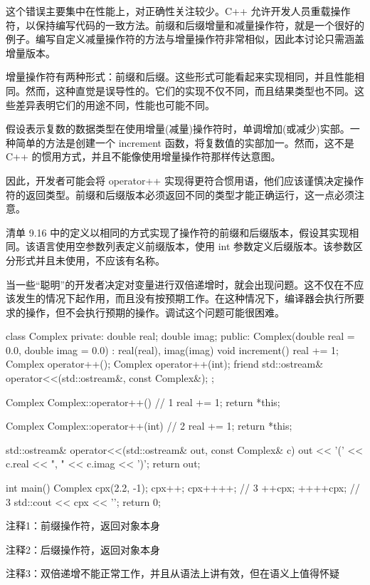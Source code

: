 这个错误主要集中在性能上，对正确性关注较少。C++ 允许开发人员重载操作符，以保持编写代码的一致方法。前缀和后缀增量和减量操作符，就是一个很好的例子。编写自定义减量操作符的方法与增量操作符非常相似，因此本讨论只需涵盖增量版本。

增量操作符有两种形式：前缀和后缀。这些形式可能看起来实现相同，并且性能相同。然而，这种直觉是误导性的。它们的实现不仅不同，而且结果类型也不同。这些差异表明它们的用途不同，性能也可能不同。


假设表示复数的数据类型在使用增量(减量)操作符时，单调增加(或减少)实部。一种简单的方法是创建一个 increment 函数，将复数值的实部加一。然而，这不是 C++ 的惯用方式，并且不能像使用增量操作符那样传达意图。

因此，开发者可能会将 operator++ 实现得更符合惯用语，他们应该谨慎决定操作符的返回类型。前缀和后缀版本必须返回不同的类型才能正确运行，这一点必须注意。

清单 9.16 中的定义以相同的方式实现了操作符的前缀和后缀版本，假设其实现相同。该语言使用空参数列表定义前缀版本，使用 int 参数定义后缀版本。该参数区分形式并且未使用，不应该有名称。

当一些“聪明”的开发者决定对变量进行双倍递增时，就会出现问题。这不仅在不应该发生的情况下起作用，而且没有按预期工作。在这种情况下，编译器会执行所要求的操作，但不会执行预期的操作。调试这个问题可能很困难。


\begin{cpp}
class Complex {
private:
  double real;
  double imag;
public:
  Complex(double real = 0.0, double imag = 0.0) : real(real), imag(imag) {}
  void increment() { real += 1; }
  Complex operator++();
  Complex operator++(int);
friend std::ostream& operator<<(std::ostream&, const Complex&);
};

Complex Complex::operator++() { // 1
  real += 1;
  return *this;
}

Complex Complex::operator++(int) { // 2
  real += 1;
  return *this;
}

std::ostream& operator<<(std::ostream& out, const Complex& c) {
  out << '(' << c.real << ", " << c.imag << ')';
  return out;
}

int main() {
  Complex cpx(2.2, -1);
  cpx++;
  cpx++++; // 3
  ++cpx;
  ++++cpx; // 3
  std::cout << cpx << '\n';
  return 0;
}
\end{cpp}

{\footnotesize
注释1：前缀操作符，返回对象本身

注释2：后缀操作符，返回对象本身

注释3：双倍递增不能正常工作，并且从语法上讲有效，但在语义上值得怀疑
}

